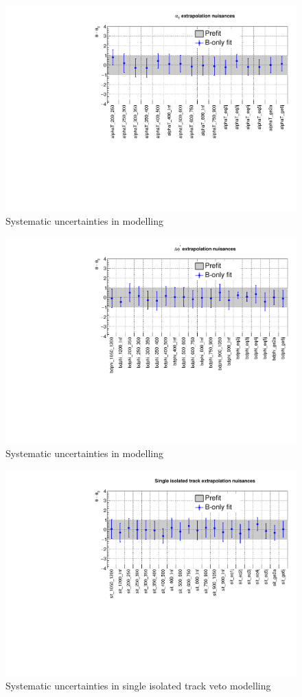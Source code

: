 \clearpage
\begin{figure}[h!]
  \centering
  \caption{Systematic uncertainties in \alphat modelling}
  \includegraphics[width=0.8\linewidth]{figures/results/36invfb/postfit/nuis/AlphaT_nuisances}
\end{figure}

\begin{figure}[h!]
  \centering
  \caption{Systematic uncertainties in \bdphi modelling}
  \includegraphics[width=0.8\linewidth]{figures/results/36invfb/postfit/nuis/bDPhi_nuisances}
\end{figure}

\clearpage
\begin{figure}[h!]
  \centering
  \caption{Systematic uncertainties in single isolated track veto modelling}
  \includegraphics[width=0.8\linewidth]{figures/results/36invfb/postfit/nuis/SIT_nuisances}
\end{figure}


